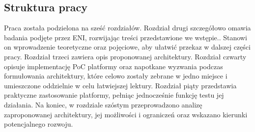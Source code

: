 \subsection{Struktura pracy}

Praca została podzielona na sześć rozdziałów. Rozdział drugi szczegółowo omawia badania podjęte przez ENI, rozwijając treści przedstawione we wstępie.. Stanowi on wprowadzenie teoretyczne oraz pojęciowe, aby ułatwić przekaz w dalszej części pracy. Rozdział trzeci zawiera opis proponowanej architektury. Rozdział czwarty opisuje implementację PoC platformy oraz napotkane wyzwania podczas formułowania architektury, które celowo zostały zebrane w jedno miejsce i umieszczone oddzielnie w celu łatwiejszej lektury. Rozdział piąty przedstawia praktyczne zastosowanie platformy, pełniąc jednocześnie funkcję testu jej działania. Na koniec, w rozdziale szóstym przeprowadzono analizę zaproponowanej architektury, jej możliwości i ograniczeń oraz wskazano kierunki potencjalnego rozwoju.